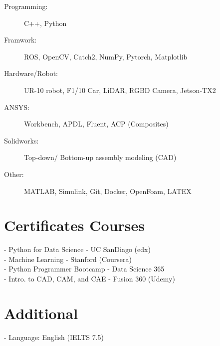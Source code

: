 \documentclass[margin, 10pt]{res} %
\begin{document}
\begin{resume}
\begin{description}
                    \item[Programming:] C++, Python
                    \item[Framwork:] ROS, OpenCV, Catch2, NumPy, Pytorch,  Matplotlib
                    \item[Hardware/Robot:] UR-10 robot, F1/10 Car, LiDAR, RGBD Camera, Jetson-TX2
                    \item[ANSYS:] Workbench, APDL, Fluent, ACP (Composites)
				\item[Solidworks:] Top-down/ Bottom-up assembly modeling (CAD)
				\item[Other: ] MATLAB, Simulink, Git, Docker, OpenFoam, LATEX
    
    \end{description}





\section{Certificates Courses \\}
\begin{list} 
    
    - Python for Data Science -  UC SanDiago (edx)\\
    - Machine Learning - Stanford (Coursera) \\
    - Python Programmer Bootcamp -  Data Science 365 \\
    - Intro. to CAD, CAM, and CAE -  Fusion 360 (Udemy)\\

\end{list}

\section{Additional \\}
\begin{list} 
    
    - Language: English (IELTS 7.5)\\



\end{list}



\end{resume}
\end{document}
